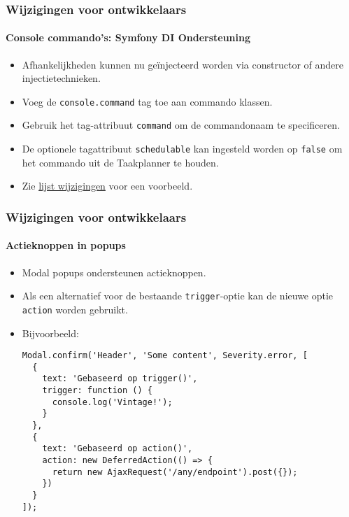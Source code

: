 \begin{frame}[fragile]
	\frametitle{Wijzigingen voor ontwikkelaars}
	\framesubtitle{Console commando's: Symfony DI Ondersteuning}

	\begin{itemize}
		\item Afhankelijkheden kunnen nu geïnjecteerd worden via constructor of andere injectietechnieken.
		\item Voeg de \texttt{console.command} tag toe aan commando klassen.
		\item Gebruik het tag-attribuut \texttt{command} om de commandonaam te specificeren.
		\item De optionele tagattribuut \texttt{schedulable} kan ingesteld worden op \texttt{false}
			om het commando uit de Taakplanner te houden.

		\item Zie
			\href{https://docs.typo3.org/c/typo3/cms-core/master/en-us/Changelog/10.3/Feature-89139-AddDependencyInjectionSupportForConsoleCommands.html}{lijst wijzigingen}
			voor een voorbeeld.
	\end{itemize}

\end{frame}


\begin{frame}[fragile]
	\frametitle{Wijzigingen voor ontwikkelaars}
	\framesubtitle{Actieknoppen in popups}

	\lstset{basicstyle=\tiny\ttfamily}

	\begin{itemize}
		\item Modal popups ondersteunen actieknoppen.
		\item Als een alternatief voor de bestaande \texttt{trigger}-optie kan de nieuwe
			optie \texttt{action} worden gebruikt.
		\item Bijvoorbeeld:

\vspace{-0.4cm}
\begin{lstlisting}
Modal.confirm('Header', 'Some content', Severity.error, [
  {
    text: 'Gebaseerd op trigger()',
    trigger: function () {
      console.log('Vintage!');
    }
  },
  {
    text: 'Gebaseerd op action()',
    action: new DeferredAction(() => {
      return new AjaxRequest('/any/endpoint').post({});
    })
  }
]);
\end{lstlisting}

	\end{itemize}

\end{frame}

